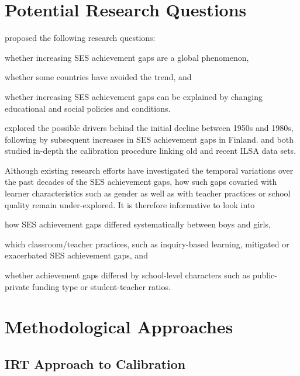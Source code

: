 \documentclass[
    a4paper,            %
    12pt,               %
    stu,                %
    donotrepeattitle,   %
    noextraspace,       %
    floatsintext,       %
    biblatex,           %
    colorlinks=true,        %
    linkcolor=red,          %
    anchorcolor=black,      %
    citecolor=blue,         %
    urlcolor=blue,          %
    bookmarks=true,         %
    bookmarksopen=false,    %
    bookmarksnumbered=true  %
]{apa7}
\begin{document}
\section{Potential Research Questions}

\textcite{chmielewski:2019} proposed the following research questions:
\begin{APAenumerate}
    \item whether increasing SES achievement gaps are a global phenomenon,
    \item whether some countries have avoided the trend, and
    \item whether increasing SES achievement gaps can be explained by changing educational and social policies and conditions.
\end{APAenumerate}

\textcite{salmelaaro:2019} explored the possible drivers behind the initial decline between 1950s and 1980s, following by subsequent increases in SES achievement gaps in Finland. \textcite{strietholt:2016} and \textcite{majoros:2021} both studied in-depth the calibration procedure linking old and recent ILSA data sets.

Although existing research efforts have investigated the temporal variations over the past decades of the SES achievement gaps, how such gaps covaried with learner characteristics such as gender as well as with teacher practices or school quality remain under-explored. It is therefore informative to look into
\begin{APAenumerate}
    \item how SES achievement gaps differed systematically between boys and girls,
    \item which classroom/teacher practices, such as inquiry-based learning, mitigated or exacerbated SES achievement gaps, and
    \item whether achievement gaps differed by school-level characters such as public-private funding type or student-teacher ratios.
\end{APAenumerate}

\section{Methodological Approaches}

\subsection{IRT Approach to Calibration}
\end{document}
